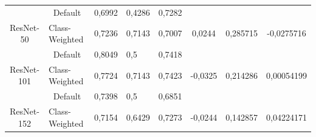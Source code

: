 \begin{table}[hbtp]
\begin{center}
{\begin{tabular}{|c|c|lll|ccc|}
    															 & Default                                                   & \multicolumn{1}{l|}{0,6992}  & \multicolumn{1}{l|}{0,4286} & 0,7282                   & \multicolumn{1}{c|}{}                          & \multicolumn{1}{c|}{}                           &                              \\ \cline{2-5}
    		\multirow{-2}{*}{ResNet-50}                          & \multicolumn{1}{l|}{Class-Weighted}                       & \multicolumn{1}{l|}{0,7236}  & \multicolumn{1}{l|}{0,7143} & 0,7007                   & \multicolumn{1}{c|}{\multirow{-2}{*}{0,0244}}  & \multicolumn{1}{c|}{\multirow{-2}{*}{0,285715}} & \multirow{-2}{*}{-0,0275716} \\ \hline
    															 & Default                                                   & \multicolumn{1}{l|}{0,8049}  & \multicolumn{1}{l|}{0,5}    & 0,7418                   & \multicolumn{1}{c|}{}                          & \multicolumn{1}{c|}{}                           &                              \\ \cline{2-5}
    		\multirow{-2}{*}{ResNet-101}                         & \multicolumn{1}{l|}{Class-Weighted}                       & \multicolumn{1}{l|}{0,7724}  & \multicolumn{1}{l|}{0,7143} & 0,7423                   & \multicolumn{1}{c|}{\multirow{-2}{*}{-0,0325}} & \multicolumn{1}{c|}{\multirow{-2}{*}{0,214286}} & \multirow{-2}{*}{0,00054199} \\ \hline
    															 & Default                                                   & \multicolumn{1}{l|}{0,7398}  & \multicolumn{1}{l|}{0,5}    & 0,6851                   & \multicolumn{1}{c|}{}                          & \multicolumn{1}{c|}{}                           &                              \\ \cline{2-5}
    		\multirow{-2}{*}{ResNet-152}                         & \multicolumn{1}{l|}{Class-Weighted}                       & \multicolumn{1}{l|}{0,7154}  & \multicolumn{1}{l|}{0,6429} & 0,7273                   & \multicolumn{1}{c|}{\multirow{-2}{*}{-0,0244}} & \multicolumn{1}{c|}{\multirow{-2}{*}{0,142857}} & \multirow{-2}{*}{0,04224171} \\ \hline
    	\end{tabular}
        }
\end{center}
\end{table}

%

